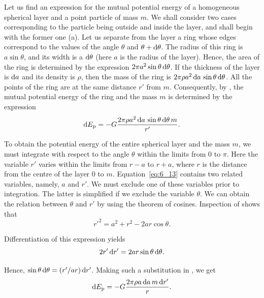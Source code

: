 Let us find an expression for the mutual potential energy of a homogeneous spherical layer and a point particle of mass $m$. We shall consider two cases corresponding to the particle being outside and inside the layer, and shall begin with the former one (a). Let us separate from the layer a ring whose edges correspond to the values of the angle $\theta$ and $\theta+\mathrm{d}\theta$. The radius of this ring is $a\sin\theta$, and its width is a $\mathrm{d}\theta$ (here $a$ is the radius of the layer). Hence, the area of the ring is determined by the expression $2\pi a^2\sin\theta\,\mathrm{d}\theta$. If the thickness of the layer is $\mathrm{d} a$ and its density is $\rho$, then the mass of the ring is $2\pi\rho a^2\,\mathrm{d} a\,\sin\theta\,\mathrm{d}\theta$. All the points of the ring are at the same distance $r'$ from $m$. Consequently, by , the mutual potential energy of the ring and the mass $m$ is determined by the expression
\begin{equation}\label{eq:6_13}
	\mathrm{d} E_{\text{p}} = -G\frac{2\pi\rho a^2\,\mathrm{d} a\,\sin\theta\,\mathrm{d}\theta\,m}{r'}.
\end{equation}

To obtain the potential energy of the entire spherical layer and the mass $m$, we must integrate  with respect to the angle $\theta$ within the limits from $0$ to $\pi$. Here the variable $r'$ varies within the limits from $r-a$ to $r+a$, where $r$ is the distance from the centre of the layer $0$ to $m$. Equation~\eqref{eq:6_13} contains two related variables, namely, $a$ and $r'$. We must exclude one of these variables prior to integration. The latter is simplified if we exclude the variable $\theta$. We can obtain the relation between $\theta$ and $r'$ by using the theorem of cosines. Inspection of  shows that
\begin{equation*}
	r'^2 = a^2 + r^2 - 2ar\cos\theta.
\end{equation*}

\noindent
Differentiation of this expression yields
\begin{equation*}
	2r'\,\mathrm{d} r' = 2ar\sin\theta\,\mathrm{d}\theta.
\end{equation*}

\noindent
Hence, $\sin\theta\,\mathrm{d}\theta=(r'/ar)\,\mathrm{d} r'$. Making such a substitution in , we get
\begin{equation*}
	\mathrm{d} E_{\text{p}} = -G\frac{2\pi\rho a\,\mathrm{d} a\,m\,\mathrm{d} r'}{r}.
\end{equation*}

